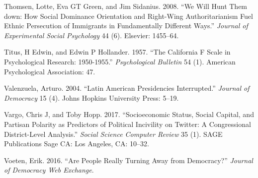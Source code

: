 \documentclass[12 pt,]{article}
\begin{document}
\leavevmode\hypertarget{ref-thomsen2008we}{}%
Thomsen, Lotte, Eva GT Green, and Jim Sidanius. 2008. ``We Will Hunt
Them down: How Social Dominance Orientation and Right-Wing
Authoritarianism Fuel Ethnic Persecution of Immigrants in Fundamentally
Different Ways.'' \emph{Journal of Experimental Social Psychology} 44
(6). Elsevier: 1455--64.

\leavevmode\hypertarget{ref-titus1957california}{}%
Titus, H Edwin, and Edwin P Hollander. 1957. ``The California F Scale in
Psychological Research: 1950-1955.'' \emph{Psychological Bulletin} 54
(1). American Psychological Association: 47.

\leavevmode\hypertarget{ref-valenzuela2004latin}{}%
Valenzuela, Arturo. 2004. ``Latin American Presidencies Interrupted.''
\emph{Journal of Democracy} 15 (4). Johns Hopkins University Press:
5--19.

\leavevmode\hypertarget{ref-vargo2017socioeconomic}{}%
Vargo, Chris J, and Toby Hopp. 2017. ``Socioeconomic Status, Social
Capital, and Partisan Polarity as Predictors of Political Incivility on
Twitter: A Congressional District-Level Analysis.'' \emph{Social Science
Computer Review} 35 (1). SAGE Publications Sage CA: Los Angeles, CA:
10--32.

\leavevmode\hypertarget{ref-voeten2016people}{}%
Voeten, Erik. 2016. ``Are People Really Turning Away from Democracy?''
\emph{Journal of Democracy Web Exchange}.
\newpage
\singlespacing 
\end{document}
